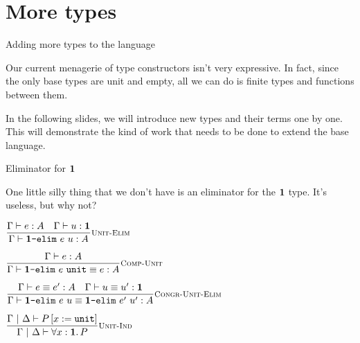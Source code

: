 \documentclass{beamer}
\begin{document}
\section{More types}

\newcommand{\Bool}{\texttt{Bool}}
\newcommand{\btrue}{\texttt{true}}
\newcommand{\bfalse}{\texttt{false}}
\newcommand{\boolelim}[3]{\texttt{if}\ #1\ \texttt{then}\ #2\ \texttt{else}\ #3}

\begin{frame}{Adding more types to the language}

Our current menagerie of type constructors isn't very expressive. In fact, since the only base types are unit and empty, all we can do is finite types and functions between them.

\vspace{1em}

In the following slides, we will introduce new types and their terms one by one. This will demonstrate the kind of work that needs to be done to extend the base language.

\end{frame}

\newcommand{\unitelim}[2]{\Unit\texttt{-elim}\ #1\ #2}

\begin{frame}{Eliminator for $\textbf{1}$}

One little silly thing that we don't have is an eliminator for the $\textbf{1}$ type. It's useless, but why not?

\vspace{1em}

\begin{center}
  $\infrule[Unit-Elim]{\typing{e}{A} \quad \typing{u}{\Unit}}{\typing{\unitelim{e}{u}}{A}}$

  \vspace{2em}

  $\infrule[Comp-Unit]{\typing{e}{A}}{\compeq{\unitelim{e}{\unit}}{e}{A}}$

  \vspace{2em}

  $\infrule[Congr-Unit-Elim]{\compeq{e}{e'}{A} \quad \compeq{u}{u'}{\Unit}}{\compeq{\unitelim{e}{u}}{\unitelim{e'}{u'}}{A}}$

  \vspace{2em}

  $\infrule[Unit-Ind]{\holds{\subst{P}{x}{\unit}}}{\holds{\All{x}[\Unit]{P}}}$
\end{center}

\end{frame}
\end{document}
